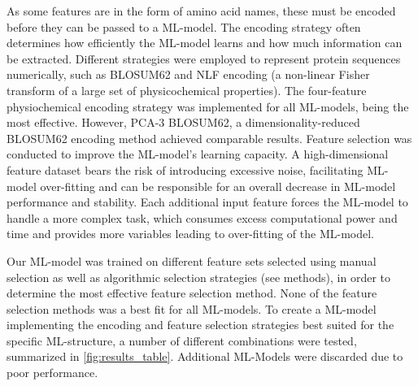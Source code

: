 \documentclass[12pt]{article}
\begin{document}
As some features are in the form of amino acid names, these must be
encoded before they can be passed to a ML-model. The
encoding strategy often determines how efficiently the ML-model learns
and how much information can be extracted. Different strategies were
employed to represent protein sequences numerically, such as BLOSUM62\cite{Henikoff1992} and NLF\cite{Nanni2011} encoding (a non-linear Fisher transform of a large set of physicochemical properties). The four-feature physiochemical encoding strategy\cite{Abhinandan2010} was implemented for all ML-models, being
the most effective. However, PCA-3 BLOSUM62, a dimensionality-reduced
BLOSUM62 encoding method achieved comparable results.
Feature selection was conducted to improve the ML-model's learning
capacity. A high-dimensional feature dataset bears the risk of
introducing excessive noise, facilitating ML-model over-fitting and can be
responsible for an overall decrease in ML-model performance and
stability. Each additional input feature forces the ML-model to
handle a more complex task, which consumes excess computational power
and time and provides more variables leading to over-fitting of the ML-model.

Our ML-model was trained on different feature sets selected using manual
selection as well as algorithmic selection strategies (see methods), in order to
determine the most effective feature selection method. None of the
feature selection methods was a best fit for all ML-models. To create a ML-model implementing the encoding and feature selection strategies best suited for the specific ML-structure, a number of different combinations were tested, summarized in \ref{fig:results_table}. Additional ML-Models were discarded due to poor performance. 
\end{document}
